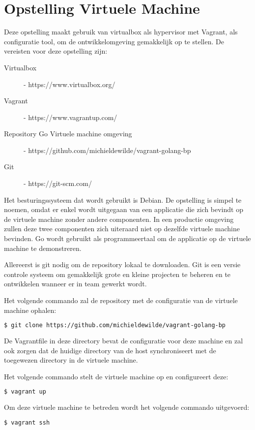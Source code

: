 \section{Opstelling Virtuele Machine}

Deze opstelling maakt gebruik van virtualbox als hypervisor met Vagrant, als configuratie tool, om de ontwikkelomgeving gemakkelijk op te stellen. 
De vereisten voor deze opstelling zijn:
\begin{description}
\item [Virtualbox] - https://www.virtualbox.org/
\item [Vagrant] - https://www.vagrantup.com/
\item [Repository Go Virtuele machine omgeving] - https://github.com/michieldewilde/vagrant-golang-bp
\item [Git] - https://git-scm.com/
\end{description}

Het besturingssysteem dat wordt gebruikt is Debian. De opstelling is simpel te noemen, omdat er enkel wordt uitgegaan van een applicatie die zich bevindt op de virtuele machine zonder andere componenten. In een productie omgeving zullen deze twee componenten zich uiteraard niet op dezelfde virtuele machine bevinden. Go wordt gebruikt als programmeertaal om de applicatie op de virtuele machine te demonstreren.

Allereerst is git nodig om de repository lokaal te downloaden. Git is een versie controle systeem om gemakkelijk grote en kleine projecten te beheren en te ontwikkelen wanneer er in team gewerkt wordt.

\noindent Het volgende commando zal de repository met de configuratie van de virtuele machine ophalen:
\begin{lstlisting}[language=bash]
  $ git clone https://github.com/michieldewilde/vagrant-golang-bp
\end{lstlisting}

De Vagrantfile in deze directory bevat de configuratie voor deze machine en zal ook zorgen dat de huidige directory van de host synchroniseert met de toegewezen directory in de virtuele machine.

\noindent Het volgende commando stelt de virtuele machine op en configureert deze:
\begin{lstlisting}[language=bash]
  $ vagrant up
\end{lstlisting}

\noindent Om deze virtuele machine te betreden wordt het volgende commando uitgevoerd:
\begin{lstlisting}[language=bash]
  $ vagrant ssh
\end{lstlisting}

